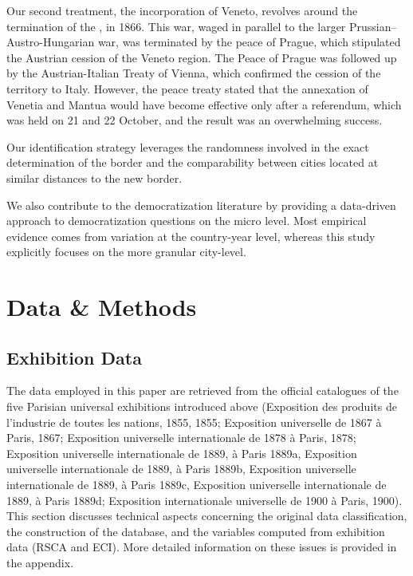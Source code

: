 Our second treatment, the incorporation of Veneto, revolves around the termination of the , in 1866. This war, waged in parallel to the larger Prussian--Austro-Hungarian war, was terminated by the peace of Prague, which stipulated the Austrian cession of the Veneto region. The Peace of Prague was followed up by the Austrian-Italian Treaty of Vienna, which confirmed the cession of the territory to Italy. However, the peace treaty stated that the annexation of Venetia and Mantua would have become effective only after a referendum, which was held on 21 and 22 October, and the result was an overwhelming success. 


Our identification strategy leverages the randomness involved in the exact determination of the border and the comparability between cities located at similar distances to the new border. 

We also contribute to the democratization literature by providing a data-driven approach to democratization questions on the micro level. Most empirical evidence comes from variation at the country-year level, whereas this study explicitly focuses on the more granular city-level. 


\section{Data \& Methods}

\subsection{Exhibition Data} 
The data employed in this paper are retrieved from the official catalogues of the five Parisian universal exhibitions introduced above (Exposition des produits de l’industrie de toutes les nations, 1855, 1855; Exposition universelle de 1867 à Paris, 1867; Exposition universelle internationale de 1878 à Paris, 1878; Exposition universelle internationale de 1889, à Paris 1889a, Exposition universelle internationale de 1889, à Paris 1889b, Exposition universelle internationale de 1889, à Paris 1889c, Exposition universelle internationale de 1889, à Paris 1889d; Exposition internationale universelle de 1900 à Paris, 1900). This section discusses technical aspects concerning the original data classification, the construction of the database, and the variables computed from exhibition data (RSCA and ECI). More detailed information on these issues is provided in the appendix.

